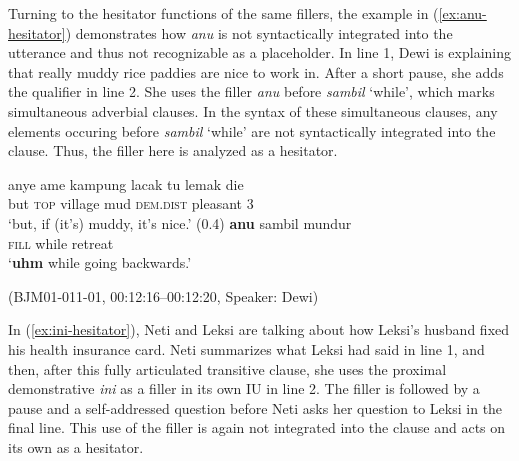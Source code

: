 \documentclass[output=paper,
\ChapterDOI{10.5281/zenodo.15697583}
colorlinks,
citecolor=brown]{langscibook}
\begin{document}
Turning to the hesitator functions of the same fillers, the example in (\ref{ex:anu-hesitator}) demonstrates how \textit{anu} is not syntactically integrated into the utterance and thus not recognizable as a placeholder. In line 1, Dewi is explaining that really muddy rice paddies are nice to work in. After a short pause, she adds the qualifier in line 2. She uses the filler \textit{anu} before \textit{sambil} `while', which marks simultaneous adverbial clauses. In the syntax of these simultaneous clauses, any elements occuring before \textit{sambil} `while' are not syntactically integrated into the clause. Thus, the filler here is analyzed as a hesitator.


\begin{exe}
\ex\label{ex:anu-hesitator} 
    \begin{xlist}[0\quad →A:]
        \gll anye ame kampung lacak tu lemak die\\
        but \textsc{top} village mud \textsc{dem.dist} pleasant 3\\
        \trans `but, if (it's) muddy, it's nice.'
        \exi{} (0.4)
        \gll  \textbf{anu} sambil mundur\\
        \textsc{fill} while retreat\\
        \trans `\textbf{uhm} while going backwards.'
    \end{xlist}
    \hfill (BJM01-011-01, 00:12:16--00:12:20, Speaker: Dewi)
\end{exe}

In (\ref{ex:ini-hesitator}), Neti and Leksi are talking about how Leksi's husband fixed his health insurance card. Neti summarizes what Leksi had said in line 1, and then, after this fully articulated transitive clause, she uses the proximal demonstrative \textit{ini} as a filler in its own IU in line 2. The filler is followed by a pause and a self-addressed question before Neti asks her question to Leksi in the final line. This use of the filler is again not integrated into the clause and acts on its own as a hesitator. 
\end{document}
